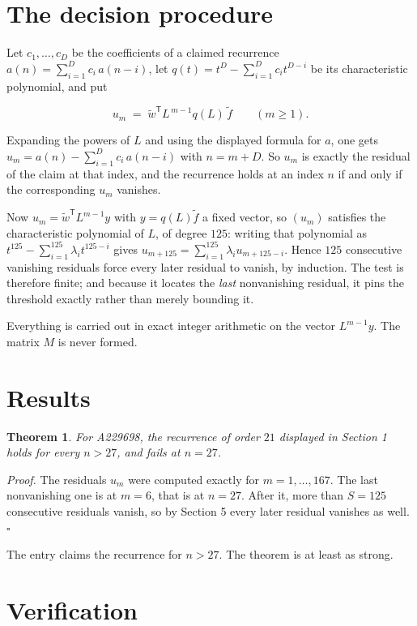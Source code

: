 \documentclass[11pt]{article}
\newtheorem{theorem}{Theorem}
\theoremstyle{definition}
\begin{document}
\section{The decision procedure}

Let $c_1,\dots,c_D$ be the coefficients of a claimed recurrence $a(n) = \sum_{i=1}^{D} c_i\,a(n-i)$, let $q(t) = t^{D} - \sum_{i=1}^{D} c_i t^{D-i}$ be its characteristic polynomial, and put

\[u_m \;=\; \tilde w^{\mathsf T} L^{\,m-1} q(L)\,\tilde f \qquad (m \ge 1).\]

Expanding the powers of $L$ and using the displayed formula for $a$, one gets $u_m = a(n) - \sum_{i=1}^{D} c_i\,a(n-i)$ with $n = m + D$. So $u_m$ is exactly the residual of the claim at that index, and the recurrence holds at an index $n$ if and only if the corresponding $u_m$ vanishes.

Now $u_m = \tilde w^{\mathsf T} L^{m-1} y$ with $y = q(L)\tilde f$ a fixed vector, so $(u_m)$ satisfies the characteristic polynomial of $L$, of degree $125$: writing that polynomial as $t^{125} - \sum_{i=1}^{125} \lambda_i t^{125-i}$ gives $u_{m+125} = \sum_{i=1}^{125} \lambda_i u_{m+125-i}$. Hence $125$ consecutive vanishing residuals force every later residual to vanish, by induction. The test is therefore finite; and because it locates the {\itshape last} nonvanishing residual, it pins the threshold exactly rather than merely bounding it.

Everything is carried out in exact integer arithmetic on the vector $L^{m-1}y$. The matrix $M$ is never formed.

\section{Results}

\begin{theorem} For A229698, the recurrence of order $21$ displayed in Section 1 holds for every $n > 27$, and fails at $n = 27$.\end{theorem}

{\itshape Proof.} The residuals $u_m$ were computed exactly for $m = 1,\dots,167$. The last nonvanishing one is at $m = 6$, that is at $n = 27$. After it, more than $S = 125$ consecutive residuals vanish, so by Section 5 every later residual vanishes as well. $\square$

The entry claims the recurrence for $n > 27$. The theorem is at least as strong.

\section{Verification}
\end{document}
